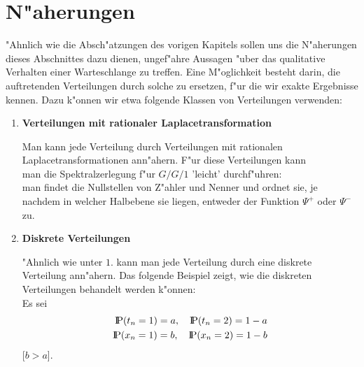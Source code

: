 \section{N"aherungen}
\bigskip
"Ahnlich wie die Absch"atzungen des vorigen Kapitels sollen uns die N"aherungen dieses Abschnittes dazu dienen, ungef"ahre Aussagen "uber das qualitative
Verhalten einer Warteschlange zu treffen. Eine M"oglichkeit besteht darin, die auftretenden Verteilungen durch solche zu ersetzen, f"ur die wir exakte Ergebnisse
kennen. Dazu k"onnen wir etwa folgende Klassen von Verteilungen verwenden:
\begin{enumerate}

\item {\bf Verteilungen mit rationaler Laplacetransformation}

Man kann jede Verteilung durch Verteilungen mit rationalen Laplacetransformationen ann"ahern. F"ur diese Verteilungen kann \\
 man die Spektralzerlegung f"ur $G/G/1$ 'leicht' durchf"uhren: \\
man findet die Nullstellen von Z"ahler und Nenner und ordnet sie, je nachdem in welcher Halbebene sie liegen, entweder
der Funktion $\Psi^{+}$ oder $\Psi^{-}$zu.

\item {\bf Diskrete Verteilungen}

"Ahnlich wie unter $1.$ kann man jede Verteilung durch eine diskrete Verteilung ann"ahern. Das folgende Beispiel zeigt, wie die diskreten Verteilungen behandelt
werden k"onnen:\\
Es sei 
\begin{eqnarray*}
  {\rm I\kern-0.2em P}(t_{n}=1)=a, \quad {\rm I\kern-0.2em P}(t_{n}=2)=1-a \\
  {\rm I\kern-0.2em P}(x_{n}=1)=b, \quad {\rm I\kern-0.2em P}(x_{n}=2)=1-b 
\end{eqnarray*}
[$b>a$].


\end{enumerate}
